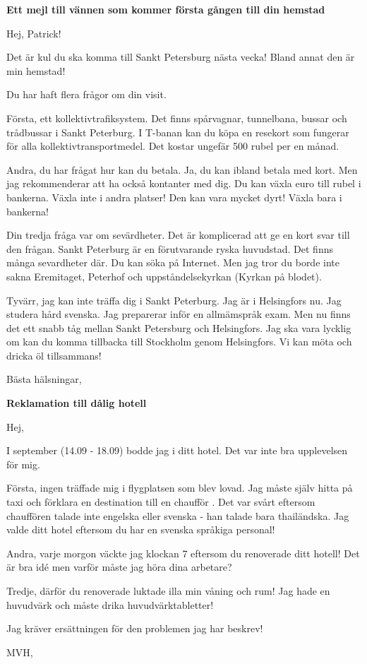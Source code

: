 \documentclass[12pt]{letter}
\date{Oktober, 18}
\begin{document}
\begin{letter}{\bf Ett mejl till vännen som kommer första gången till din hemstad}
\opening{Hej, Patrick!}

Det är kul du ska komma till Sankt Petersburg nästa vecka! Bland annat den är min hemstad!

Du har haft flera frågor om din visit.

Första, ett kollektivtrafiksystem. Det finns spårvagnar, tunnelbana, bussar och trådbussar i Sankt Peterburg. I T-banan kan du köpa en resekort som fungerar för alla kollektivtransportmedel. Det kostar ungefär 500 rubel per en månad.

Andra, du har frågat hur kan du betala. Ja, du kan ibland betala med kort. Men jag rekommenderar att ha också kontanter med dig. Du kan växla euro till rubel i bankerna. Växla inte i andra platser! Den kan vara mycket dyrt! Växla bara i bankerna!

Din tredja fråga var om sevärdheter. Det är komplicerad att ge en kort svar till den frågan. Sankt Peterburg är en förutvarande ryska huvudstad. Det finns många sevardheter där. Du kan söka på Internet. Men jag tror du borde inte sakna Eremitaget, Peterhof och uppståndelsekyrkan (Kyrkan på blodet).

Tyvärr, jag kan inte träffa dig i Sankt Peterburg. Jag är i Helsingfors nu. Jag studera hård svenska. Jag preparerar  inför en allmämspråk exam.  Men nu finns det ett snabb tåg mellan Sankt Petersburg och Helsingfors. Jag ska vara lycklig om kan du komma tillbacka till Stockholm genom Helsingfors. Vi kan möta och dricka öl tillsammans!


\closing{Bästa hälsningar,}
\end{letter}

\signature{Vitaly Repin}
\address{Dålig hotell\\ Dåliggatan 13 \\ Phatthaya\\ Thailand}

\begin{letter}{\bf Reklamation till dålig hotell}
\opening{Hej,}

I september (14.09 - 18.09) bodde jag i ditt hotel. Det var inte bra upplevelsen för mig.

Första, ingen träffade mig i flygplatsen som blev lovad. Jag måste själv hitta på taxi och förklara en destination till en chaufför . Det var svårt eftersom chauffören talade inte engelska eller svenska - han talade bara thailändska. Jag valde ditt hotel eftersom du har en svenska språkiga  personal!

Andra, varje morgon väckte jag klockan 7 eftersom du renoverade ditt hotell! Det är bra idé men varför måste jag  höra dina arbetare?

Tredje, därför du renoverade luktade illa min våning och rum! Jag hade en huvudvärk och måste drika huvudvärktabletter!

Jag kräver ersättningen för den problemen jag har beskrev!

\closing{MVH,}
\end{letter}
\end{document}
